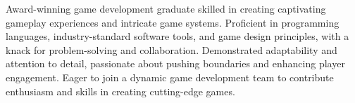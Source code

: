 

\begin{cvparagraph}

Award-winning game development graduate skilled in creating captivating gameplay experiences and intricate game systems. Proficient in programming languages, industry-standard software tools, and game design principles, with a knack for problem-solving and collaboration. Demonstrated adaptability and attention to detail, passionate about pushing boundaries and enhancing player engagement. Eager to join a dynamic game development team to contribute enthusiasm and skills in creating cutting-edge games.

\end{cvparagraph}
